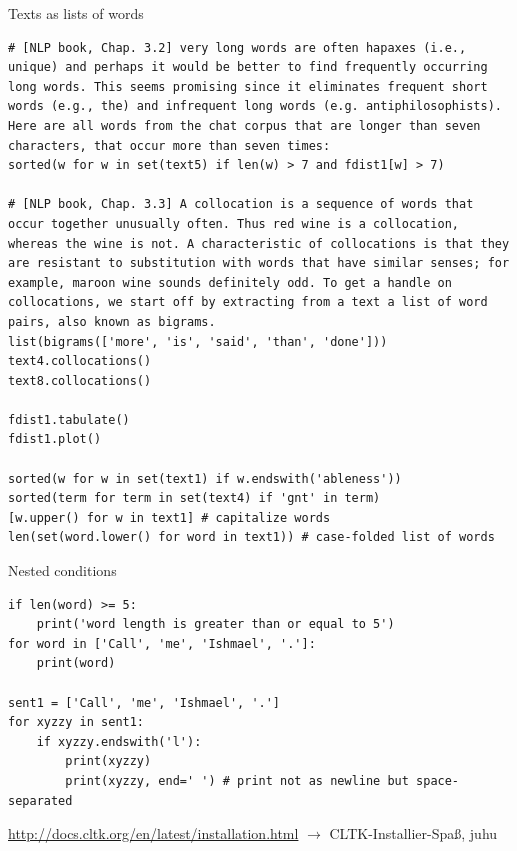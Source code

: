 \documentclass[10pt]{beamer}
\begin{document}
\begin{frame}{Texts as lists of words} 
\begin{verbatim}
# [NLP book, Chap. 3.2] very long words are often hapaxes (i.e., unique) and perhaps it would be better to find frequently occurring long words. This seems promising since it eliminates frequent short words (e.g., the) and infrequent long words (e.g. antiphilosophists). Here are all words from the chat corpus that are longer than seven characters, that occur more than seven times:
sorted(w for w in set(text5) if len(w) > 7 and fdist1[w] > 7)

# [NLP book, Chap. 3.3] A collocation is a sequence of words that occur together unusually often. Thus red wine is a collocation, whereas the wine is not. A characteristic of collocations is that they are resistant to substitution with words that have similar senses; for example, maroon wine sounds definitely odd. To get a handle on collocations, we start off by extracting from a text a list of word pairs, also known as bigrams.
list(bigrams(['more', 'is', 'said', 'than', 'done']))
text4.collocations()
text8.collocations()

fdist1.tabulate()
fdist1.plot()

sorted(w for w in set(text1) if w.endswith('ableness'))
sorted(term for term in set(text4) if 'gnt' in term)
[w.upper() for w in text1] # capitalize words
len(set(word.lower() for word in text1)) # case-folded list of words
\end{verbatim}
\end{frame}

\begin{frame}{Nested conditions} 
\begin{verbatim}
if len(word) >= 5:
    print('word length is greater than or equal to 5')
for word in ['Call', 'me', 'Ishmael', '.']:
    print(word)

sent1 = ['Call', 'me', 'Ishmael', '.']
for xyzzy in sent1:
    if xyzzy.endswith('l'):
        print(xyzzy)
        print(xyzzy, end=' ') # print not as newline but space-separated
\end{verbatim}
\end{frame}

\begin{frame}[standout]
\protect\url{http://docs.cltk.org/en/latest/installation.html} $\to$ CLTK-Installier-Spaß, juhu \faSmileO
\end{frame}
\end{document}
